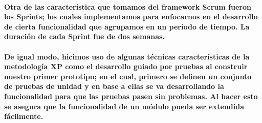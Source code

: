 \paragraph{Otra de las característica que tomamos del framework Scrum fueron los Sprints; los cuales implementamos para enfocarnos en el desarrollo de cierta funcionalidad que agrupamos en un periodo de tiempo. La duración de cada Sprint fue de dos semanas.}


\paragraph{De igual modo, hicimos uso de algunas técnicas características de la metodología XP como el desarrollo guiado por pruebas al construir nuestro primer prototipo; en el cual, primero se definen un conjunto de pruebas  de unidad y en base a ellas se va desarrollando la funcionalidad para que las pruebas pasen sin problemas. Al hacer esto se asegura que la funcionalidad de un módulo pueda ser extendida fácilmente.}